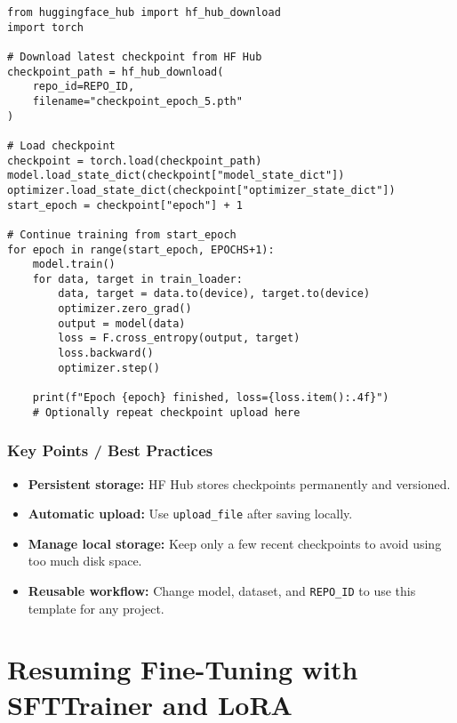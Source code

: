 \begin{tcolorbox}[colback=green!5!white, colframe=green!75!black, title=Resume Training]
\begin{verbatim}
from huggingface_hub import hf_hub_download
import torch

# Download latest checkpoint from HF Hub
checkpoint_path = hf_hub_download(
    repo_id=REPO_ID,
    filename="checkpoint_epoch_5.pth"
)

# Load checkpoint
checkpoint = torch.load(checkpoint_path)
model.load_state_dict(checkpoint["model_state_dict"])
optimizer.load_state_dict(checkpoint["optimizer_state_dict"])
start_epoch = checkpoint["epoch"] + 1

# Continue training from start_epoch
for epoch in range(start_epoch, EPOCHS+1):
    model.train()
    for data, target in train_loader:
        data, target = data.to(device), target.to(device)
        optimizer.zero_grad()
        output = model(data)
        loss = F.cross_entropy(output, target)
        loss.backward()
        optimizer.step()

    print(f"Epoch {epoch} finished, loss={loss.item():.4f}")
    # Optionally repeat checkpoint upload here
\end{verbatim}
\end{tcolorbox}

\subsubsection{Key Points / Best Practices}

\begin{tcolorbox}[colback=blue!5!white, colframe=blue!75!black, title=Notes]
\begin{itemize}
    \item \textbf{Persistent storage:} HF Hub stores checkpoints permanently and versioned.
    \item \textbf{Automatic upload:} Use \texttt{upload\_file} after saving locally.
    \item \textbf{Manage local storage:} Keep only a few recent checkpoints to avoid using too much disk space.
    \item \textbf{Reusable workflow:} Change model, dataset, and \texttt{REPO\_ID} to use this template for any project.
\end{itemize}
\end{tcolorbox}

\newpage
\newpage
\section{Resuming Fine-Tuning with SFTTrainer and LoRA}

